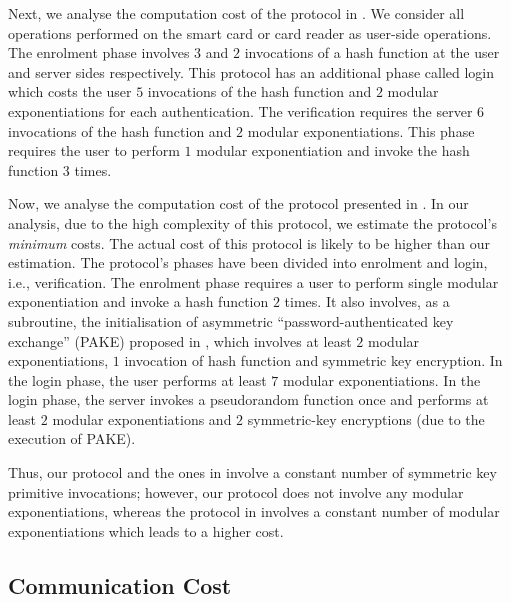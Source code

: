 Next, we analyse the computation cost of the protocol in \cite{WangW18}. We consider all operations performed on the smart card or card reader as user-side operations. The enrolment phase involves $3$ and $2$ invocations of a hash function at the user and server sides respectively. This protocol has an additional phase called login which costs the user  $5$ invocations of the hash function and $2$ modular exponentiations for each authentication.  The verification requires the server $6$ invocations of the hash function and $2$ modular exponentiations. This phase requires the user to perform $1$ modular exponentiation and invoke the hash function $3$ times. 


Now, we analyse the computation cost of the protocol presented in \cite{JareckiJKSS21}. In our analysis, due to the high complexity of this protocol, we estimate the protocol's \emph{minimum} costs. The actual cost of this protocol is likely to be higher than our estimation. The protocol's phases have been divided into enrolment and login, i.e., verification. The enrolment phase requires a user to perform single modular exponentiation and invoke a hash function $2$ times. It also involves, as a subroutine, the initialisation of asymmetric  ``password-authenticated key exchange'' (PAKE) proposed in \cite{GentryMR06}, which involves at least $2$ modular exponentiations, $1$ invocation of hash function and symmetric key encryption. In the login phase, the user performs at least $7$ modular exponentiations. In the login phase, the server invokes a pseudorandom function once and performs at least $2$ modular exponentiations and $2$ symmetric-key encryptions (due to the execution of PAKE). 


Thus,  our protocol and the ones in \cite{WangW18,JareckiJKSS21} involve a constant number of symmetric key primitive invocations; however, our protocol does not involve any modular exponentiations, whereas the protocol in  \cite{WangW18,JareckiJKSS21} involves a constant number of modular exponentiations which leads to a higher cost. 


\subsection{Communication Cost}


